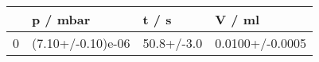 \begin{tabular}{llll}
\toprule
{} &           p / mbar &       t / s &           V / ml \\
\midrule
0 &  (7.10+/-0.10)e-06 &  50.8+/-3.0 &  0.0100+/-0.0005 \\
\bottomrule
\end{tabular}
